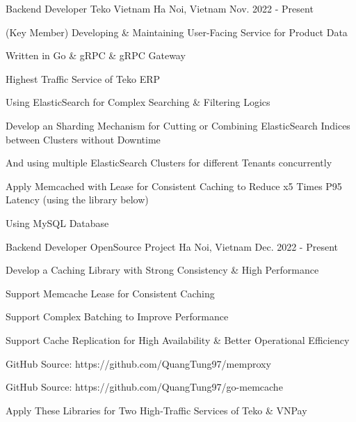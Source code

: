 


\begin{cventries}


\cventry
{Backend Developer} %
{Teko Vietnam} %
{Ha Noi, Vietnam} %
{Nov. 2022 - Present} %
{ %
\begin{cvitems}
\item{(Key Member) Developing \& Maintaining User-Facing Service for Product Data}
\item{Written in Go \& gRPC \& gRPC Gateway}
\item{Highest Traffic Service of Teko ERP}
\item{Using ElasticSearch for Complex Searching \& Filtering Logics}
\item{Develop an Sharding Mechanism for Cutting or Combining ElasticSearch Indices between Clusters without Downtime} 
\item{And using multiple ElasticSearch Clusters for different Tenants concurrently} 
\item{Apply Memcached with Lease for Consistent Caching to Reduce x5 Times P95 Latency (using the library below)}
\item{Using MySQL Database}
\end{cvitems}
}


\cventry
{Backend Developer} %
{OpenSource Project} %
{Ha Noi, Vietnam} %
{Dec. 2022 - Present} %
{ %
\begin{cvitems}
\item{Develop a Caching Library with Strong Consistency \& High Performance}
\item{Support Memcache Lease for Consistent Caching}
\item{Support Complex Batching to Improve Performance}
\item{Support Cache Replication for High Availability \& Better Operational Efficiency}
\item{GitHub Source: https://github.com/QuangTung97/memproxy}
\item{GitHub Source: https://github.com/QuangTung97/go-memcache}
\item{Apply These Libraries for Two High-Traffic Services of Teko \& VNPay}
\end{cvitems}
}


\end{cventries}
